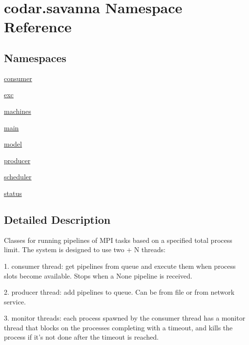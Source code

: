 \hypertarget{namespacecodar_1_1savanna}{}\section{codar.\+savanna Namespace Reference}
\label{namespacecodar_1_1savanna}
\subsection*{Namespaces}
\begin{DoxyCompactItemize}
\item 
 \hyperlink{namespacecodar_1_1savanna_1_1consumer}{consumer}
\item 
 \hyperlink{namespacecodar_1_1savanna_1_1exc}{exc}
\item 
 \hyperlink{namespacecodar_1_1savanna_1_1machines}{machines}
\item 
 \hyperlink{namespacecodar_1_1savanna_1_1main}{main}
\item 
 \hyperlink{namespacecodar_1_1savanna_1_1model}{model}
\item 
 \hyperlink{namespacecodar_1_1savanna_1_1producer}{producer}
\item 
 \hyperlink{namespacecodar_1_1savanna_1_1scheduler}{scheduler}
\item 
 \hyperlink{namespacecodar_1_1savanna_1_1status}{status}
\end{DoxyCompactItemize}


\subsection{Detailed Description}
\begin{DoxyVerb}Classes for running pipelines of MPI tasks based on a specified
total process limit. The system is designed to use two + N threads:

1. consumer thread: get pipelines from queue and execute them when process
   slots become available. Stops when a None pipeline is received.

2. producer thread: add pipelines to queue. Can be from file or from network
   service.

3. monitor threads: each process spawned by the consumer thread has a monitor
   thread that blocks on the processes completing with a timeout, and kills the
   process if it's not done after the timeout is reached.
\end{DoxyVerb}
 